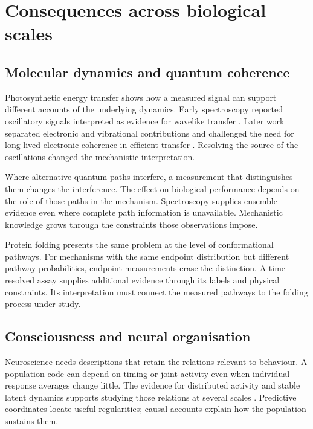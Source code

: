 \documentclass[10pt,twocolumn]{article}
\begin{document}
\section{Consequences across biological scales}

\subsection{Molecular dynamics and quantum coherence}

Photosynthetic energy transfer shows how a measured signal can support different accounts of the underlying dynamics. Early spectroscopy reported oscillatory signals interpreted as evidence for wavelike transfer \citep{engel2007}. Later work separated electronic and vibrational contributions and challenged the need for long-lived electronic coherence in efficient transfer \citep{duan2017,thyrhaug2018,cao2020}. Resolving the source of the oscillations changed the mechanistic interpretation.

Where alternative quantum paths interfere, a measurement that distinguishes them changes the interference. The effect on biological performance depends on the role of those paths in the mechanism. Spectroscopy supplies ensemble evidence even where complete path information is unavailable. Mechanistic knowledge grows through the constraints those observations impose.

Protein folding presents the same problem at the level of conformational pathways. For mechanisms with the same endpoint distribution but different pathway probabilities, endpoint measurements erase the distinction. A time-resolved assay supplies additional evidence through its labels and physical constraints. Its interpretation must connect the measured pathways to the folding process under study.

\subsection{Consciousness and neural organisation}

Neuroscience needs descriptions that retain the relations relevant to behaviour. A population code can depend on timing or joint activity even when individual response averages change little. The evidence for distributed activity and stable latent dynamics supports studying those relations at several scales \citep{stringer2019,gallego2020}. Predictive coordinates locate useful regularities; causal accounts explain how the population sustains them.
\end{document}
